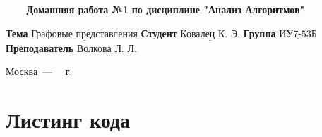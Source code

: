 \documentclass[a4paper,14pt, unknownkeysallowed]{extreport}
\begin{document}
\begin{titlepage}
	
	\begin{center}
		\noindent\begin{minipage}{1.3\textwidth}\centering
		\Large\textbf{   ~~~ Домашняя работа №1}\newline
		\textbf{по дисциплине "Анализ Алгоритмов"}\newline\newline\newline
		\end{minipage}
	\end{center}
	
	\noindent\textbf{Тема} 			$\underline{\text{Графовые представления}}$\newline\newline
	\noindent\textbf{Студент} 		$\underline{\text{Ковалец К. Э.}}$\newline\newline
	\noindent\textbf{Группа} 		$\underline{\text{ИУ7-53Б}}$\newline\newline
	\noindent\textbf{Преподаватель} $\underline{\text{Волкова Л. Л.}}$\newline
	
	\begin{center}
		\vfill
		Москва~---~\the\year
		~г.
	\end{center}
	\restoregeometry
\end{titlepage}





\chapter{Листинг кода}
\end{document}
